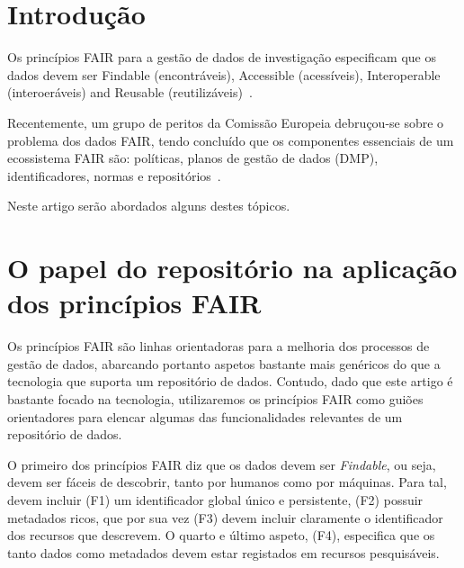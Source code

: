 \documentclass[sigconf,nonacm]{acmart}
\begin{document}

\maketitle

\section{Introdução}

Os princípios FAIR para a gestão de dados de investigação especificam que os dados devem ser Findable (encontráveis), Accessible (acessíveis), Interoperable (interoeráveis) and Reusable (reutilizáveis)~\cite{wilkinson2016fair}. 

Recentemente, um grupo de peritos da Comissão Europeia debruçou-se sobre o problema dos dados FAIR, tendo concluído que os componentes essenciais de um ecossistema FAIR são: políticas, planos de gestão de dados (DMP), identificadores, normas e repositórios~\cite{hodson2018turning}. 


Neste artigo serão abordados alguns destes tópicos.

\section{O papel do repositório na aplicação dos princípios FAIR}

Os princípios FAIR são linhas orientadoras para a melhoria dos processos de gestão de dados, abarcando portanto aspetos bastante mais genéricos do que a tecnologia que suporta um repositório de dados. Contudo, dado que este artigo é bastante focado na tecnologia, utilizaremos os princípios FAIR como guiões orientadores para elencar algumas das funcionalidades relevantes de um repositório de dados. 

O primeiro dos princípios FAIR diz que os dados devem ser \emph{Findable}, ou seja, devem ser fáceis de descobrir, tanto por humanos como por máquinas. Para tal, devem incluir (F1) um identificador global único e persistente, (F2) possuir metadados ricos, que por sua vez (F3) devem incluir claramente o identificador dos recursos que descrevem. O quarto e último aspeto, (F4), especifica que os tanto dados como metadados devem estar registados em recursos pesquisáveis. 
\end{document}
